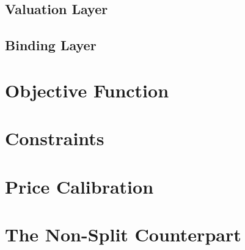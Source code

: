 \subsection{Valuation Layer}
\label{sec:model-valuation}

\subsection{Binding Layer}
\label{sec:model-binding}

\section{Objective Function}
\label{sec:model-objective}

\section{Constraints}
\label{sec:model-constraints}

\section{Price Calibration}
\label{sec:model-pricing}

\section{The Non-Split Counterpart}
\label{sec:model-nosplit}

